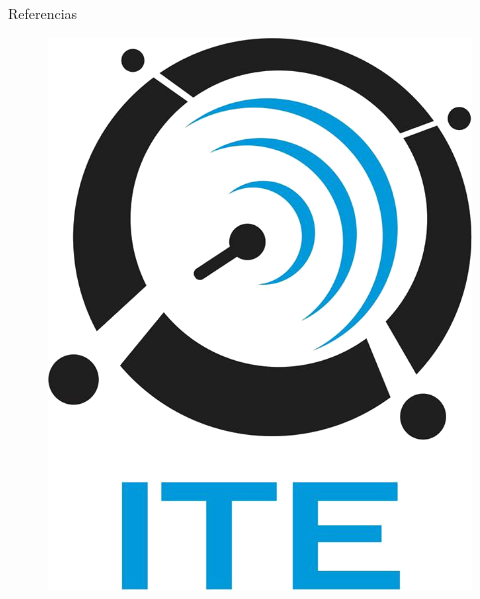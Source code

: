 \documentclass{beamer}
\begin{document}
\begin{frame}[fragile]{}
\begin{columns}[t]
\begin{column}{0.90\linewidth}
\begin{block}{Referencias}
\begin{minipage}[t]{0.71\textwidth}
\begin{small}
\begin{thebibliography}{widestlabel}
        \end{thebibliography}
        \end{small}
        \end{minipage}
        \hfill
           \begin{minipage}[t]{0.25\textwidth}
           	\vspace{0pt}
           	\begin{center}
           		\begin{figure}
           			\includegraphics[scale=0.2]{../graphics/ite.png} 
           		\end{figure}
           	\end{center}
           \end{minipage}
      \end{block}
   \end{column}
\end{columns}

\end{frame}
\end{document}
